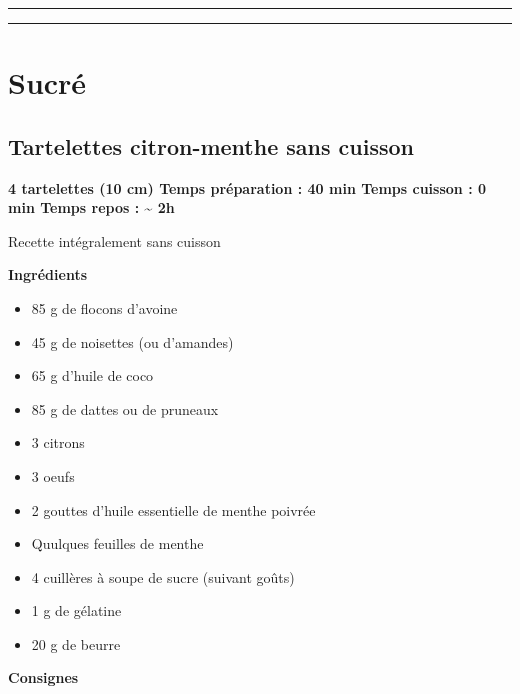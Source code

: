 \documentclass[]{book}
\providecommand{\tightlist}{%
  \setlength{\itemsep}{0pt}\setlength{\parskip}{0pt}}
\begin{document}
\begin{center}\rule{0.5\linewidth}{0.5pt}\end{center}

\begin{center}\rule{0.5\linewidth}{0.5pt}\end{center}

\hypertarget{sucruxe9-1}{%
\section*{Sucré}\label{sucruxe9-1}}

\hypertarget{tartelettes-citron-menthe-sans-cuisson}{%
\subsection*{\texorpdfstring{{Tartelettes citron-menthe sans cuisson}}{Tartelettes citron-menthe sans cuisson}}\label{tartelettes-citron-menthe-sans-cuisson}}

\begin{sucrebox}
\textbf{4 tartelettes (10 cm) \textbar{} Temps préparation : 40 min
\textbar{} Temps cuisson : 0 min \textbar{} Temps repos :
\textasciitilde{} 2h}

Recette intégralement sans cuisson
\end{sucrebox}

\textbf{Ingrédients}

\begin{itemize}
\tightlist
\item
  85 g de flocons d'avoine
\item
  45 g de noisettes (ou d'amandes)
\item
  65 g d'huile de coco
\item
  85 g de dattes ou de pruneaux
\item
  3 citrons
\item
  3 oeufs
\item
  2 gouttes d'huile essentielle de menthe poivrée
\item
  Quulques feuilles de menthe
\item
  4 cuillères à soupe de sucre (suivant goûts)
\item
  1 g de gélatine
\item
  20 g de beurre
\end{itemize}

\textbf{Consignes}
\end{document}
